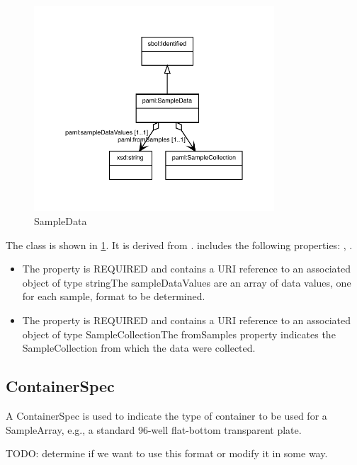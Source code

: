 \begin{figure}[h!]%
\centering%
\includegraphics[width=0.8\textwidth]{paml_classes/SampleData_abstraction_hierarchy.pdf}%
\caption{SampleData}%
\label{fig:SampleData}%
\end{figure}

%
The  class is shown in \ref{fig:SampleData}. It is derived from .%
 includes the following properties: , . %
\begin{itemize}%
\item%
The  property is REQUIRED and contains a URI reference to an associated object of type stringThe sampleDataValues are an array of data values, one for each sample, format to be determined.%
\item%
The  property is REQUIRED and contains a URI reference to an associated object of type SampleCollectionThe fromSamples property indicates the SampleCollection from which the data were collected.%
\end{itemize}%
\subsection{ContainerSpec}%
\label{sec:paml:ContainerSpec}%
A ContainerSpec is used to indicate the type of container to be used for a SampleArray, e.g.,
        a standard 96-well flat-bottom transparent plate.

        TODO: determine if we want to use this format or modify it in some way.%
\linebreak%
\linebreak%


